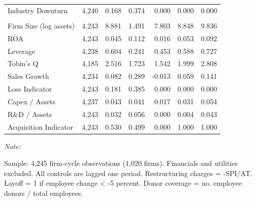 \documentclass[
  10pt,
]{article}
\begin{document}
\begin{table}[!h]
\begin{threeparttable}
\begin{tabular}[t]{lrrrrrr}
\hspace{1em}Industry Downturn & 4,240 & 0.168 & 0.374 & 0.000 & 0.000 & 0.000\\
\addlinespace[0.3em]
\multicolumn{7}{l}{\textbf{Panel D: Lagged Controls}}\\
\hspace{1em}Firm Size (log assets) & 4,243 & 8.881 & 1.491 & 7.803 & 8.848 & 9.836\\
\hspace{1em}ROA & 4,243 & 0.045 & 0.112 & 0.016 & 0.053 & 0.092\\
\hspace{1em}Leverage & 4,238 & 0.604 & 0.241 & 0.453 & 0.588 & 0.727\\
\hspace{1em}Tobin's Q & 4,185 & 2.516 & 1.723 & 1.542 & 1.999 & 2.808\\
\hspace{1em}Sales Growth & 4,234 & 0.082 & 0.289 & -0.013 & 0.059 & 0.141\\
\hspace{1em}Loss Indicator & 4,243 & 0.181 & 0.385 & 0.000 & 0.000 & 0.000\\
\hspace{1em}Capex / Assets & 4,237 & 0.043 & 0.041 & 0.017 & 0.031 & 0.054\\
\hspace{1em}R\&D / Assets & 4,243 & 0.032 & 0.056 & 0.000 & 0.004 & 0.043\\
\hspace{1em}Acquisition Indicator & 4,243 & 0.530 & 0.499 & 0.000 & 1.000 & 1.000\\
\bottomrule
\end{tabular}
\begin{tablenotes}[para]
\item \textit{Note: } 
\item Sample: 4,245 firm-cycle observations (1,020 firms). Financials and utilities excluded. All controls are lagged one period. Restructuring charges = -SPI/AT. Layoff = 1 if employee change < -5 percent. Donor coverage = no. employee donors / total employees.
\end{tablenotes}
\end{threeparttable}
\end{table}

\newpage
\end{document}

